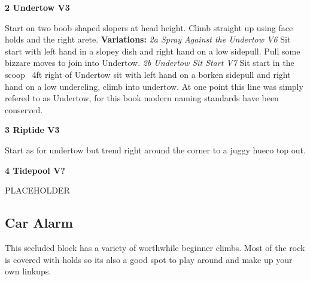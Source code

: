 \begin{multicols*}{2}
					\label{rt:Undertow} \colorbox{green!20}{\textbf{2 Undertow V3 \ding{72}    }}
					\begin{adjustwidth}{1cm}{}
					Start on two boob shaped slopers at head height. Climb straight up using face holds and the right arete.
					\newline \textbf{Variations:} \newline
						\label{vr:Spray Against the Undertow} \colorbox{RoyalBlue!20}{\emph{2a Spray Against the Undertow V6  }}
						Sit start with left hand in a slopey dish and right hand on a low sidepull. Pull some bizzare moves to join into Undertow.
						\label{vr:Undertow Sit Start} \colorbox{Goldenrod!50}{\emph{2b Undertow Sit Start V7  \ding{72}   }}
						Sit start in the scoop ~4ft right of Undertow sit with left hand on a borken sidepull and right hand on a low undercling, climb into undertow. At one point this line was simply refered to as Undertow, for this book modern naming standards have been conserved.
					\end{adjustwidth}
					\label{rt:Riptide} \colorbox{green!20}{\textbf{3 Riptide V3    }}
					\begin{adjustwidth}{1cm}{}
					Start as for undertow but trend right around the corner to a juggy hueco top out.
					\end{adjustwidth}
					\label{rt:Tidepool} \colorbox{black!20}{\textbf{4 Tidepool V?  }}
					\begin{adjustwidth}{1cm}{}
					PLACEHOLDER
					\end{adjustwidth}
			\subsection*{Car Alarm}\label{bf:Car Alarm}
			This secluded block has a variety of worthwhile beginner climbs. Most of the rock is covered with holds so its also a good spot to play around and make up your own linkups.
			


\end{multicols*}
